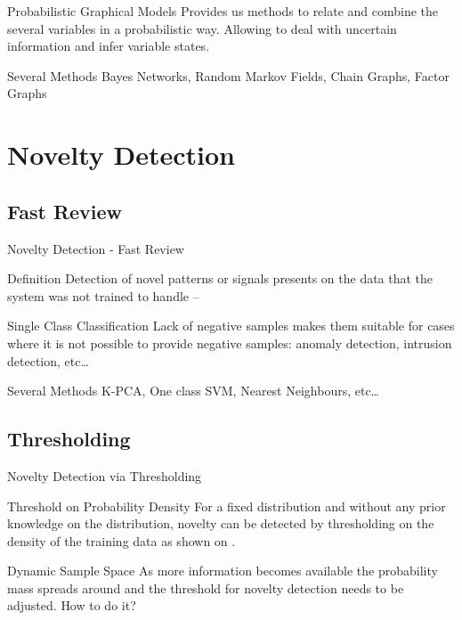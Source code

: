 \documentclass[compress]{beamer}
\begin{document}
\begin{frame}{Probabilistic Graphical Models}
Provides us methods to relate and combine the several variables in a probabilistic way.
Allowing to deal with uncertain information and infer variable states.

\vfill

\begin{block}{Several Methods}
Bayes Networks, Random Markov Fields, Chain Graphs, Factor Graphs
\end{block}

\end{frame}


\section{Novelty Detection}

\subsection{Fast Review}
\begin{frame}{Novelty Detection - Fast Review}
  \begin{block}{Definition}
    Detection of novel patterns or signals presents on the data that the system was not trained
    to handle -- \cite{markou2003novelty}
  \end{block}
  \begin{block}{Single Class Classification}
    Lack of negative samples makes them suitable for cases where it is not possible to
    provide negative samples: anomaly detection, intrusion detection, etc\dots
  \end{block}
  \begin{block}{Several Methods}
    K-PCA, One class SVM, Nearest Neighbours, etc\dots
  \end{block}
\end{frame}

\subsection{Thresholding}
\begin{frame}{Novelty Detection via Thresholding}

\begin{block}{Threshold on Probability Density}
For a fixed distribution and without any prior knowledge on the distribution,
novelty can be detected by thresholding on the density of
the training data as shown on \cite{bishop1994novelty}.
\end{block}

\begin{block}{Dynamic Sample Space}
As more information becomes available the probability mass spreads around and
the threshold for novelty detection needs to be adjusted.
\alert<2->{How to do it?}
\end{block}
\end{frame}
\end{document}
